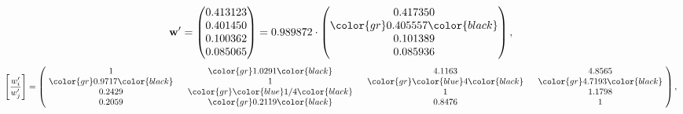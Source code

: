 \begin{example}
\begin{equation*}
\mathbf{w}^{\prime} =
\begin{pmatrix}
0.413123\\
0.401450\\
0.100362\\
0.085065
\end{pmatrix} =
0.989872\cdot
\begin{pmatrix}
0.417350\\
\color{gr} 0.405557\color{black} \\
0.101389\\
0.085936
\end{pmatrix},
\end{equation*}
\begin{equation*}
\left[ \frac{{w}^{\prime}_i}{{w}^{\prime}_j} \right] =
\begin{pmatrix}
$\,\,$ 1 $\,\,$ & $\,\,$\color{gr} 1.0291\color{black} $\,\,$ & $\,\,$4.1163$\,\,$ & $\,\,$4.8565$\,\,$ \\
$\,\,$\color{gr} 0.9717\color{black} $\,\,$ & $\,\,$ 1 $\,\,$ & $\,\,$\color{gr} \color{blue} 4\color{black} $\,\,$ & $\,\,$\color{gr} 4.7193\color{black}   $\,\,$ \\
$\,\,$0.2429$\,\,$ & $\,\,$\color{gr} \color{blue}  1/4\color{black} $\,\,$ & $\,\,$ 1 $\,\,$ & $\,\,$1.1798 $\,\,$ \\
$\,\,$0.2059$\,\,$ & $\,\,$\color{gr} 0.2119\color{black} $\,\,$ & $\,\,$0.8476$\,\,$ & $\,\,$ 1  $\,\,$ \\
\end{pmatrix},
\end{equation*}
\end{example}
\newpage
